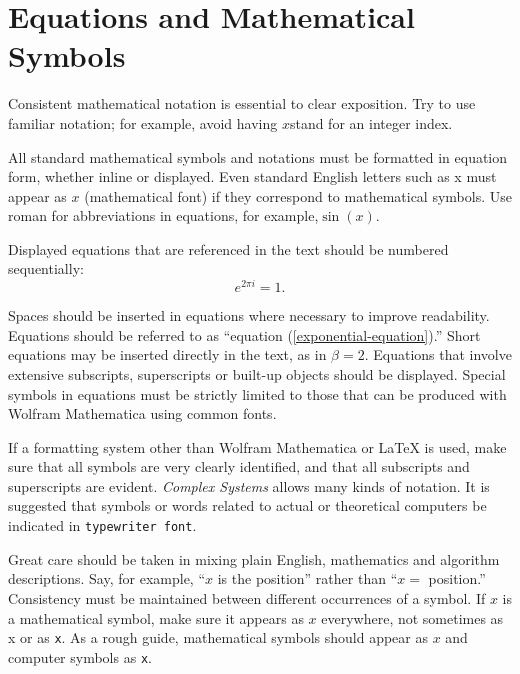 \documentclass{article}
\begin{document}
\section{Equations and Mathematical Symbols}

Consistent mathematical notation is essential to clear exposition. Try to use familiar notation; for example, avoid having \(x\)stand for an integer index.

All standard mathematical symbols and notations must be formatted in equation form, whether inline or displayed. Even standard English letters such as x must appear as \(x\) (mathematical font) if they correspond to mathematical symbols. Use roman for abbreviations in equations, for example,\(\sin (x)\).
%

Displayed equations that are referenced in the text should be numbered sequentially: 
\begin{equation}
e^{2\pi i}=1.
\label{exponential-equation}
\end{equation}

Spaces should be inserted in equations where necessary to improve readability. Equations should be referred to as {``}equation (\ref{exponential-equation}).{''} Short equations may be inserted directly in the text, as in \(\beta =2\). Equations that involve extensive subscripts, superscripts or built-up objects should be displayed. Special symbols in equations must be strictly limited to those that can be produced with Wolfram Mathematica using common fonts.

If a formatting system other than Wolfram Mathematica or LaTeX is used, make sure that all symbols are very clearly identified, and that all subscripts and superscripts are evident. \textit{Complex Systems} allows many kinds of notation. It is suggested that symbols or words related to actual or theoretical computers be indicated in \texttt{typewriter font}. 

Great care should be taken in mixing plain English, mathematics and algorithm descriptions. Say, for example, {``}\(x\) is the position{''} rather than {``}\(x=\) position.{''} Consistency must be maintained between different occurrences of a symbol. If \(x\) is a mathematical symbol, make sure it appears as \(x\) everywhere, not sometimes as x or as \texttt{x}. As a rough guide, mathematical symbols should appear as \(x\) and computer symbols as \texttt{x}. 
\end{document}
